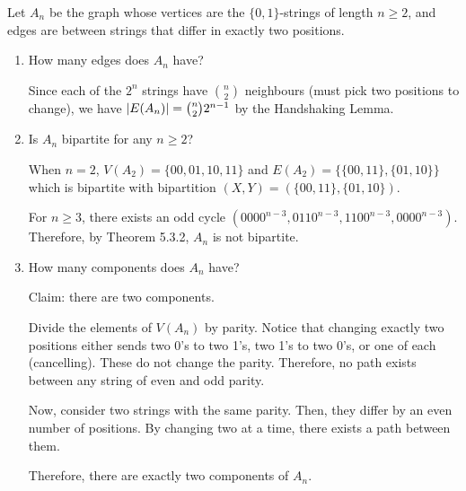 \begin{xca}\label{xca:4107}
  Let $A_n$ be the graph whose vertices are the $\{0,1\}$-strings of length $n \geq 2$,
  and edges are between strings that differ in exactly two positions.
\end{xca}
\begin{enumerate}
  \item How many edges does $A_n$ have?
        \begin{sol}
          Since each of the $2^n$ strings have $\binom{n}{2}$ neighbours
          (must pick two positions to change),
          we have $\abs{E(A_n)} = \binom{n}{2}2^{n-1}$ by the Handshaking Lemma.
        \end{sol}
  \item Is $A_n$ bipartite for any $n \geq 2$?
        \begin{sol}
          When $n = 2$, $V(A_2) = \{00,01,10,11\}$
          and $E(A_2) = \{\{00,11\},\{01,10\}\}$
          which is bipartite with bipartition $(X,Y) = (\{00,11\},\{01,10\})$.

          For $n \geq 3$, there exists an odd cycle
          $(0000^{n-3}, 0110^{n-3}, 1100^{n-3}, 0000^{n-3})$.
          Therefore, by Theorem 5.3.2, $A_n$ is not bipartite.
        \end{sol}
  \item How many components does $A_n$ have?
        \begin{sol}
          Claim: there are two components.

          Divide the elements of $V(A_n)$ by parity.
          Notice that changing exactly two positions either sends
          two 0's to two 1's, two 1's to two 0's, or one of each (cancelling).
          These do not change the parity.
          Therefore, no path exists between any string of even and odd parity.

          Now, consider two strings with the same parity.
          Then, they differ by an even number of positions.
          By changing two at a time, there exists a path between them.

          Therefore, there are exactly two components of $A_n$.
        \end{sol}
\end{enumerate}

